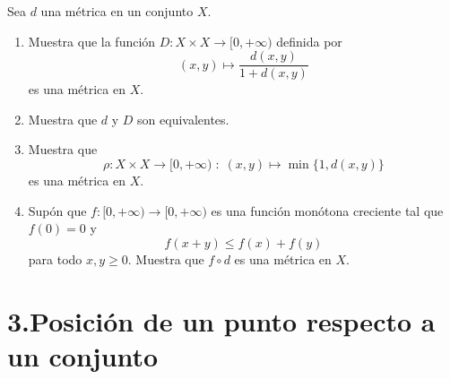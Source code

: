 \documentclass[b5paper,10pt,twoside]{book}
\begin{document}
\begin{problem}
Sea $d$ una métrica en un conjunto $X$.

\begin{enumerate}[label=(\roman*)]
\item Muestra que la función ${D} : X \times X \to [0, +\infty)$ definida por 
\[
(x, y) \mapsto \frac{d(x, y)}{1 + d(x, y)}
\]
es una métrica en $X$.

\item Muestra que $d$ y ${D}$ son equivalentes.

\item Muestra que 
\[
\rho : X \times X \to [0, +\infty) \; : \;  (x, y) \mapsto \min\{1, d(x, y)\}
\]
es una métrica en $X$.

\item Supón que $f : [0, +\infty) \to [0, +\infty)$ es una función monótona creciente tal que $f(0) = 0$ y 
\[
f(x + y) \leq f(x) + f(y)
\]
para todo \(x,y\geq 0\).
Muestra que $f \circ d$ es una métrica en $X$.
\end{enumerate}
    
\end{problem}



\section*{3.\enspace Posición de un punto respecto  a un conjunto}
\end{document}
